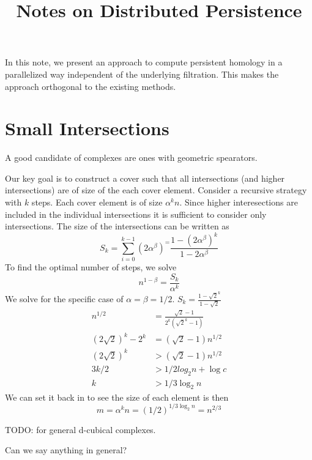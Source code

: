 \documentclass{amsart}
\title{Notes on Distributed Persistence}
\begin{document}
\maketitle

In this note, we present an approach to compute persistent homology in a parallelized way independent of the underlying filtration. This makes the approach orthogonal to the existing methods.



\section{Small Intersections}
A good candidate of complexes are ones with geometric spearators. 

Our key goal is to construct a cover such that all intersections (and higher intersections) are of size of the  each cover element. Consider a 
recursive strategy with $k$ steps. 
Each cover element is of size $\alpha^k n$. Since higher interesections are included in the individual intersections it is sufficient to consider only intersections.
The size of the intersections can be written as 
$$
S_k =\sum\limits_{i=0}^{k-1} (2\alpha^\beta)^ = \frac{1-(2\alpha^\beta)^k  }  {1-2\alpha^\beta}$$
To find the optimal number of steps, we solve
$$ n^{1-\beta} = \frac{S_k}{\alpha^k}$$
We solve for the specific case of $\alpha = \beta = 1/2$.
$S_k = \frac{1-\sqrt{2}^k}{1-\sqrt{2}}$
\begin{align*}
	n^{1/2} &=  \frac{\sqrt{2}-1}{2^k(\sqrt{2}^k-1)}\\
	(2\sqrt{2})^k - 2^k &= (\sqrt{2}-1) n^{1/2}\\
	(2\sqrt{2})^k  &> (\sqrt{2}-1) n^{1/2}\\
	3k/2 &> 1/2 log_2 n + \log c  \\
	k &> 1/3 \log_2 n 
\end{align*}
We can set it back in to see the size of each element is then
$$m = \alpha^k n =   (1/2)^{1/3\log_2 n} = n^{2/3}$$


TODO: for general d-cubical complexes.


Can we say anything in general?
\end{document}
